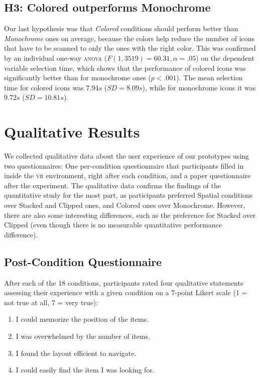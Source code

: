 \documentclass{tufte-book} %
\begin{document}
\subsection{H3: Colored outperforms Monochrome}
Our last hypothesis was that \emph{Colored} conditions should perform better than \emph{Monochrome} ones on average, because the colors help reduce the number of icons that have to be scanned to only the ones with the right color. This was confirmed by an individual one-way \textsc{anova} ($F(1,3519) = 60.31, \alpha = .05$) on the dependent variable selection time, which shows that the performance of colored icons was significantly better than for monochrome ones ($p < .001$). The mean selection time for colored icons was $7.94 s$ ($SD = 8.09 s$), while for monochrome icons it was $9.72 s$ ($SD = 10.81 s$).

\section{Qualitative Results}

We collected qualitative data about the user experience of our prototypes using two questionnaires: One per-condition questionnaire that participants filled in inside the \textsc{vr} environment, right after each condition, and a paper questionnaire after the experiment. The qualitative data confirms the findings of the quantitative study for the most part, as participants preferred Spatial conditions over Stacked and Clipped ones, and Colored ones over Monochrome. However, there are also some interesting differences, such as the preference for Stacked over Clipped (even though there is no measurable quantitative performance difference).

\subsection{Post-Condition Questionnaire}
After each of the 18 conditions, participants rated four qualitative statements assessing their experience with a given condition on a 7-point Likert scale (1 = not true at all, 7 = very true):

\begin{enumerate}[label=\arabic*. , wide=0.5em,  leftmargin=*]
  \item I could memorize the position of the items.
  \item I was overwhelmed by the number of items.
  \item I found the layout efficient to navigate.
  \item I could easily find the item I was looking for.
\end{enumerate}
\end{document}
